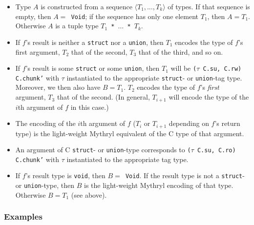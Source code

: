 \begin{itemize}
\item Type $A$ is constructed from a sequence $\langle T_1, \ldots,
  T_k \rangle$ of types.  If that sequence is empty, then {\tt $A =$
    Void}; if the sequence has only one element $T_1$, then $A = T_1$.
  Otherwise $A$ is a tuple type {\tt $T_1$ * $\ldots$ * $T_k$}.
\item If $f$'s result is neither a {\tt struct} nor a {\tt union},
  then $T_1$ encodes the type of $f$'s first argument, $T_2$ that of
  the second, $T_3$ that of the third, and so on.
\item If $f$'s result is some {\tt struct} or some {\tt union}, then
  $T_1$ will be {\tt ($\tau$ C.su, C.rw) C.chunk'} with $\tau$
  instantiated to the appropriate {\tt struct}- or {\tt union}-tag
  type.  Moreover, we then also have $B = T_1$. $T_2$ encodes the type
  of $f$'s {\em first} argument, $T_3$ that of the second.  (In
  general, $T_{i+1}$ will encode the type of the $i$th argument of
  $f$ in this case.)
\item The encoding of the $i$th argument of $f$ ($T_i$ or $T_{i+1}$
  depending on $f$'s return type) is the light-weight Mythryl equivalent of
  the C type of that argument.
\item An argument of C {\tt struct}- or {\tt union}-type corresponds
  to {\tt ($\tau$ C.su, C.ro) C.chunk'} with $\tau$ instantiated to the
  appropriate tag type.
\item If $f$'s result type is {\tt void}, then {\tt $B =$ Void}.  If
  the result type is not a {\tt struct}- or {\tt union}-type, then $B$
  is the light-weight Mythryl encoding of that type.  Otherwise $B = T_1$
  (see above).
\end{itemize}

\subsubsection*{Examples}

